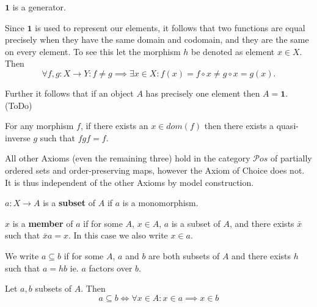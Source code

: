 \begin{axiom}
$\mathbf{1}$ is a generator.
\end{axiom}

\begin{remark}
Since $\mathbf{1}$ is used to represent our elements, it follows that two functions are equal precisely when they have the same domain and codomain, and they are the same on every element. To see this let the morphism $h$ be denoted as element $x \in X$. Then
\begin{equation*}
\forall f,g: X \longrightarrow Y: f \neq g \implies \exists x \in X : f(x) = f \circ x \neq g \circ x = g(x).
\end{equation*}

Further it follows that if an object $A$ has precisely one element then $A = \mathbf{1}$. (ToDo)
\end{remark}

\begin{axiom}[AC]
For any morphism $f$, if there exists an $x \in dom(f)$ then there exists a quasi-inverse $g$ such that $fgf = f$.
\end{axiom}

\begin{remark}
All other Axioms (even the remaining three) hold in the category $\mathcal{P}os$ of partially ordered sets and order-preserving maps, however the Axiom of Choice does not. It is thus independent of the other Axioms by model construction. 
\end{remark}

\begin{definition}
$a:X \longrightarrow A$ is a \textbf{subset} of $A$ if $a$ is a monomorphism.

$x$ is a \textbf{member} of $a$ if for some $A$, $x \in A$, $a$ is a subset of $A$, and there exists $\bar{x}$ such that $\bar{x}a = x$. In this case we also write $x \in a$.

We write $a \subseteq b$ if for some $A$, $a$ and $b$ are both subsets of $A$ and there exists $h$ such that $a = hb$ ie. $a$ factors over $b$.
\end{definition}

\begin{theorem}
Let $a, b$ subsets of $A$. Then
\begin{equation}
a \subseteq b \iff \forall x \in A: x \in a \implies x \in b
\end{equation}
\end{theorem}


